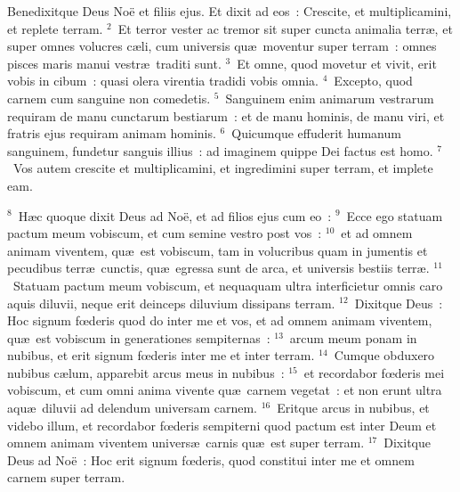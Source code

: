 \lettrine[lines=3,image=true,loversize=0.05,lraise=-0.03]{B}{}enedixitque Deus No\"e et filiis ejus. Et dixit ad eos~: Crescite, et multiplicamini, et replete terram.
${}^{2}$~Et terror vester ac tremor sit super cuncta animalia terr\ae , et super omnes volucres c\ae li, cum universis qu\ae\ moventur super terram~: omnes pisces maris manui vestr\ae\ traditi sunt.
${}^{3}$~Et omne, quod movetur et vivit, erit vobis in cibum~: quasi olera virentia tradidi vobis omnia.
${}^{4}$~Excepto, quod carnem cum sanguine non comedetis.
${}^{5}$~Sanguinem enim animarum vestrarum requiram de manu cunctarum bestiarum~: et de manu hominis, de manu viri, et fratris ejus requiram animam hominis.
${}^{6}$~Quicumque effuderit humanum sanguinem, fundetur sanguis illius~: ad imaginem quippe Dei factus est homo.
${}^{7}$~Vos autem crescite et multiplicamini, et ingredimini super terram, et implete eam.


${}^{8}$~H\ae c quoque dixit Deus ad No\"e, et ad filios ejus cum eo~:
${}^{9}$~Ecce ego statuam pactum meum vobiscum, et cum semine vestro post vos~:
${}^{10}$~et ad omnem animam viventem, qu\ae\ est vobiscum, tam in volucribus quam in jumentis et pecudibus terr\ae\ cunctis, qu\ae\ egressa sunt de arca, et universis bestiis terr\ae .
${}^{11}$~Statuam pactum meum vobiscum, et nequaquam ultra interficietur omnis caro aquis diluvii, neque erit deinceps diluvium dissipans terram.
${}^{12}$~Dixitque Deus~: Hoc signum fœderis quod do inter me et vos, et ad omnem animam viventem, qu\ae\ est vobiscum in generationes sempiternas~:
${}^{13}$~arcum meum ponam in nubibus, et erit signum fœderis inter me et inter terram.
${}^{14}$~Cumque obduxero nubibus c\ae lum, apparebit arcus meus in nubibus~:
${}^{15}$~et recordabor fœderis mei vobiscum, et cum omni anima vivente qu\ae\ carnem vegetat~: et non erunt ultra aqu\ae\ diluvii ad delendum universam carnem.
${}^{16}$~Eritque arcus in nubibus, et videbo illum, et recordabor fœderis sempiterni quod pactum est inter Deum et omnem animam viventem univers\ae\ carnis qu\ae\ est super terram.
${}^{17}$~Dixitque Deus ad No\"e~: Hoc erit signum fœderis, quod constitui inter me et omnem carnem super terram.


